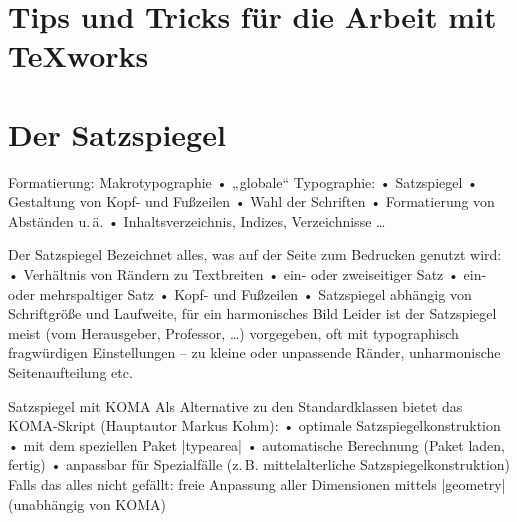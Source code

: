 

\usepackage[xspace]{ellipsis}
\MakeShortVerb{|}


\section{Tips und Tricks für die Arbeit mit \TeX works}

\section{Der Satzspiegel}
\begin{frame}{Formatierung: Makrotypographie}
• „globale“ Typographie:
• Satzspiegel
• Gestaltung von Kopf- und Fußzeilen 
• Wahl der Schriften
• Formatierung von Abständen u.\,ä.
• Inhaltsverzeichnis, Indizes, Verzeichnisse …
\• 
\end{frame}


\begin{frame}{Der Satzspiegel}
Bezeichnet alles, was auf der Seite zum Bedrucken genutzt wird:
• Verhältnis von Rändern zu Textbreiten
• ein- oder zweiseitiger Satz
• ein- oder mehrspaltiger Satz
• Kopf- und Fußzeilen
• Satzspiegel abhängig von Schriftgröße und Laufweite, für ein harmonisches Bild\pause
\•
Leider ist der Satzspiegel meist (vom Herausgeber, Professor, …) vorgegeben, oft mit typographisch fragwürdigen Einstellungen – zu kleine oder unpassende Ränder, unharmonische Seitenaufteilung etc.
\end{frame}

\begin{frame}{Satzspiegel mit KOMA}
Als Alternative zu den Standardklassen bietet das KOMA-Skript (Hauptautor Markus Kohm):
• optimale Satzspiegelkonstruktion
• mit dem speziellen Paket |typearea|
• automatische Berechnung (Paket laden, fertig)
• anpassbar für Spezialfälle (z.\,B. mittelalterliche Satzspiegelkonstruktion)\pause
\• 
Falls das alles nicht gefällt: freie Anpassung aller Dimensionen mittels |geometry| (unabhängig von KOMA)
\end{frame}


